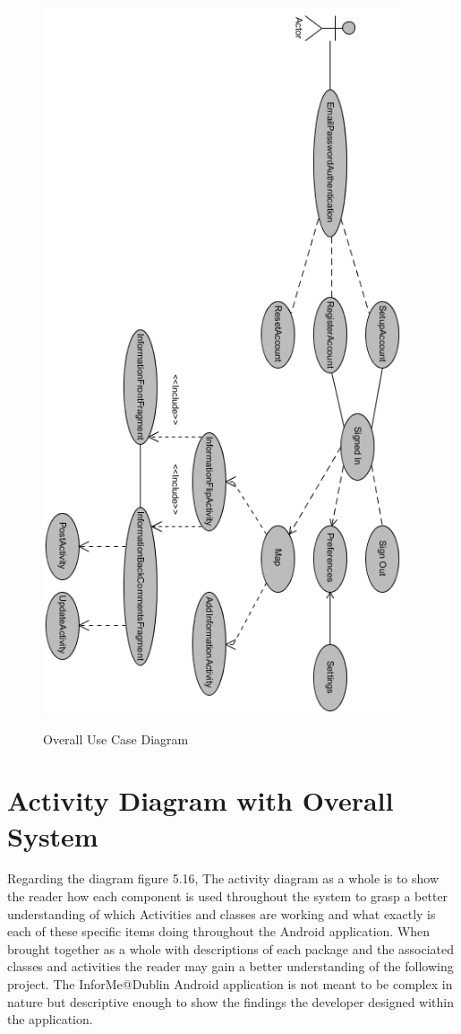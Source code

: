 \begin{figure}[htbp]
    \center \includegraphics[width=300pt]{FullActivityUseCase}\\
    \caption{Overall Use Case Diagram} \label{Figure: Overall Use Case Diagram }
\end{figure}

\newpage

\section{Activity Diagram with Overall System}
Regarding the diagram figure 5.16, The activity diagram as a whole is to show the reader how each component is used throughout the system to grasp a better understanding of which Activities and classes are working and what exactly is each of these specific items doing throughout the Android application. When brought together as a whole with descriptions of each package and the associated classes and activities the reader may gain a better understanding of the following project. The InforMe@Dublin Android application is not meant to be complex in nature but descriptive enough to show the findings the developer designed within the application.

